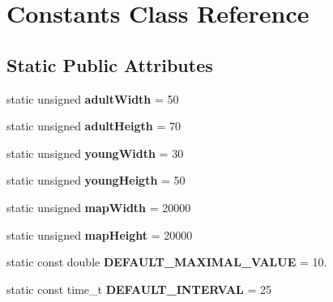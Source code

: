 \hypertarget{class_constants}{}\section{Constants Class Reference}
\label{class_constants}
\subsection*{Static Public Attributes}
\begin{DoxyCompactItemize}
\item 
\hypertarget{class_constants_ab2eed82cd8de585b6c0d06741379cf1e}{}static unsigned {\bfseries adult\+Width} = 50\label{class_constants_ab2eed82cd8de585b6c0d06741379cf1e}

\item 
\hypertarget{class_constants_a517b6f74c71e1c6baab9da5d38d5a6ee}{}static unsigned {\bfseries adult\+Heigth} = 70\label{class_constants_a517b6f74c71e1c6baab9da5d38d5a6ee}

\item 
\hypertarget{class_constants_a336c33767b0d7a3ccbe90aae02b8f82a}{}static unsigned {\bfseries young\+Width} = 30\label{class_constants_a336c33767b0d7a3ccbe90aae02b8f82a}

\item 
\hypertarget{class_constants_a231d253282e7ea22d3bccf9b657a4277}{}static unsigned {\bfseries young\+Heigth} = 50\label{class_constants_a231d253282e7ea22d3bccf9b657a4277}

\item 
\hypertarget{class_constants_a0c171be2d5b8d39fd258ecae4eaabd5a}{}static unsigned {\bfseries map\+Width} = 20000\label{class_constants_a0c171be2d5b8d39fd258ecae4eaabd5a}

\item 
\hypertarget{class_constants_ab9c6d7080df54bb9a092560b4e31c55c}{}static unsigned {\bfseries map\+Height} = 20000\label{class_constants_ab9c6d7080df54bb9a092560b4e31c55c}

\item 
\hypertarget{class_constants_a5b3d745b3930454e9ead9c0c3ce7e98a}{}static const double {\bfseries D\+E\+F\+A\+U\+L\+T\+\_\+\+M\+A\+X\+I\+M\+A\+L\+\_\+\+V\+A\+L\+U\+E} = 10.\label{class_constants_a5b3d745b3930454e9ead9c0c3ce7e98a}

\item 
\hypertarget{class_constants_a6d6f2bf576a47801ca093b9540d7436f}{}static const time\+\_\+t {\bfseries D\+E\+F\+A\+U\+L\+T\+\_\+\+I\+N\+T\+E\+R\+V\+A\+L} = 25\label{class_constants_a6d6f2bf576a47801ca093b9540d7436f}


\end{DoxyCompactItemize}
